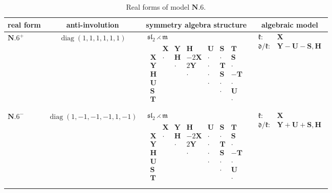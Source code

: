 \documentclass[10pt,a4paper]{amsart}
\DeclareMathOperator{\diag}{diag}
\newcommand{\mbH}{\mathbf{H}}
\newcommand{\mbS}{\mathbf{S}}
\newcommand{\mbT}{\mathbf{T}}
\newcommand{\mbU}{\mathbf{U}}
\newcommand{\mbX}{\mathbf{X}}
\newcommand{\mbY}{\mathbf{Y}}
\newcommand{\mfd} {\mathfrak{d}}
\newcommand{\mfk} {\mathfrak{k}}
\newcommand{\mfm} {\mathfrak{m}}
\newcommand{\mfsl} {\mathfrak{sl}}
\numberwithin{equation}{section}
\begin{document}
\begin{table}[th!]
\caption{Real forms of model $\mathbf{N.6}$.}\label{table:real-N.6}\vspace{1mm}

\tiny
\centering
\begin{tabular}{lccl}
\toprule
 real form
 & anti-involution
 & symmetry algebra structure
 & \multicolumn{1}{c}{algebraic model} \\
\midrule
 $\mathbf{N.6}^+$
 & $\diag(1,1,1,1,1,1)$
 &
 $\begin{array}{c}
 \mfsl_2 \rightthreetimes \mfm \\
 \begin{array}{c|cccccc}
 & \mbX & \mbY & \mbH & \mbU & \mbS & \mbT \\
	 \hline
 \mbX & \cdot & \mbH & -2 \mbX & \cdot & \cdot & \mbS \\
 \mbY & & \cdot & 2 \mbY & \cdot & \mbT & \cdot \\
 \mbH & & & \cdot & \cdot & \mbS & -\mbT \\
 \mbU & & & & \cdot & \cdot & \cdot \\
 \mbS & & & & & \cdot & \mbU \\
 \mbT & & & & & & \cdot \\
 \end{array}
 \end{array}$
 & $\begin{array}{rl}
 \mfk\colon
 &\!\!\!\!\!\! \mbX \\
	 \mfd / \mfk\colon
 &\!\!\!\!\!\! \mbY - \mbU - \mbS, \mbH
 \end{array}$ \\
\cmidrule{1-4}
 $\mathbf{N.6}^-$
 & $\diag(1, -1, -1, -1, 1, -1)$
 &
 $\begin{array}{c}
 \mfsl_2 \rightthreetimes \mfm \\
 \begin{array}{c|cccccc}
 & \mbX & \mbY & \mbH & \mbU & \mbS & \mbT \\
	 \hline
 \mbX & \cdot & \mbH & -2 \mbX & \cdot & \cdot & \mbS \\
 \mbY & & \cdot & 2 \mbY & \cdot & \mbT & \cdot \\
 \mbH & & & \cdot & \cdot & \mbS & -\mbT \\
 \mbU & & & & \cdot & \cdot & \cdot \\
 \mbS & & & & & \cdot & \mbU \\
 \mbT & & & & & & \cdot \\
 \end{array}
 \end{array}$
 & $\begin{array}{rl}
 \mfk\colon
 &\!\!\!\!\!\! \mbX \\
	 \mfd / \mfk\colon
 &\!\!\!\!\!\! \mbY + \mbU + \mbS, \mbH
 \end{array}$ \\
\bottomrule
\end{tabular}


\end{table}
\end{document}
